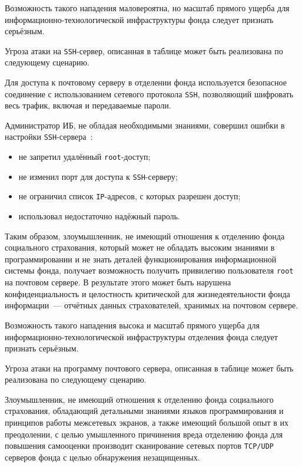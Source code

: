 Возможность такого нападения маловероятна, но масштаб прямого ущерба
для информационно-технологической инфраструктуры фонда следует
признать серьёзным.

\point Угроза атаки на \texttt{SSH}-сервер, описанная в таблице может
быть реализована по следующему сценарию.

\point Для доступа к почтовому серверу в отделении фонда используется
безопасное соединение с использованием сетевого протокола
\texttt{SSH}, позволяющий шифровать весь трафик, включая и
передаваемые пароли.

Администратор ИБ, не обладая необходимыми знаниями, совершил ошибки в
настройки \texttt{SSH}-сервера~\cite{4}:

\begin{itemize}
\item не запретил удалённый \texttt{root}-доступ;
\item не изменил порт для доступа к \texttt{SSH}-серверу;
\item не ограничил список \texttt{IP}-адресов, с которых разрешен
  доступ;
\item использовал недостаточно надёжный пароль.
\end{itemize}

Таким образом, злоумышленник, не имеющий отношения к отделению фонда
социального страхования, который может не обладать высоким знаниями в
программировании и не знать деталей функционирования информационной
системы фонда, получает возможность получить привилегию пользователя
\texttt{root} на почтовом сервере. В результате этого может быть
нарушена конфиденциальность и целостность критической для
жизнедеятельности фонда информации~--- отчётных данных страхователей,
хранимых на почтовом сервере.

Возможность такого нападения высока и масштаб прямого ущерба для
информационно-технологической инфраструктуры отделения фонда следует
признать серьёзным.

\point Угроза атаки на программу почтового сервера, описанная в
таблице может быть реализована по следующему сценарию.

\point Злоумышленник, не имеющий отношения к отделению фонда
социального страхования, обладающий детальными знаниями языков
программирования и принципов работы межсетевых экранов, а также
имеющий большой опыт в их преодолении, с целью умышленного причинения
вреда отделению фонда для повышения самооценки производит сканирование
сетевых портов \texttt{TCP/UDP} серверов фонда с целью обнаружения
незащищенных.

